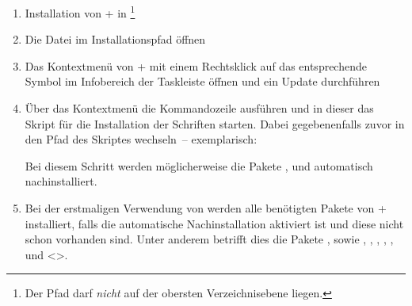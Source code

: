 \minisec{\MiKTeX+}

\begin{enumerate}
\item Installation von \MiKTeX+ in 
  \footnote{%
    Der Pfad darf \emph{nicht} auf der obersten Verzeichnisebene 
     liegen.%
  }
\item Die Datei  im Installationspfad öffnen
\item Das Kontextmenü von \MiKTeX+ mit einem Rechtsklick auf das entsprechende 
  Symbol im Infobereich der Taskleiste öffnen und ein Update durchführen
\item Über das Kontextmenü die Kommandozeile ausführen und in dieser das Skript 
  für die Installation der Schriften  starten.
  Dabei gegebenenfalls zuvor in den Pfad des Skriptes wechseln~-- exemplarisch:
  \begin{quoting}
  \RET*%
  \RET
  \end{quoting}
  Bei diesem Schritt werden möglicherweise die Pakete , 
   und  automatisch nachinstalliert.
\item Bei der erstmaligen Verwendung von \TUDScript werden alle benötigten 
  Pakete von \MiKTeX+ installiert, falls die automatische Nachinstallation 
  aktiviert ist und diese nicht schon vorhanden sind. Unter anderem betrifft 
  dies die Pakete ,  sowie ,
  , , , 
  ,  und <>.
\end{enumerate}
%
%
